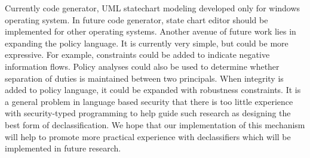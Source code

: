 Currently code generator, UML statechart modeling developed only for windows operating system. In future code generator, state chart editor should be implemented for other operating systems. Another avenue of future work lies in expanding the policy
language. It is currently very simple, but could be more expressive. For example, constraints could be added to indicate negative information flows. Policy analyses could also be used to determine whether separation of duties is maintained between two principals. When integrity is added to policy language, it could be expanded with robustness constraints. It is a general problem in language based security that there is too little experience with security-typed programming to help guide such research as designing the best form of declassification. We hope that our implementation of this mechanism will help to promote more practical experience with declassifiers which will be implemented in future research.




